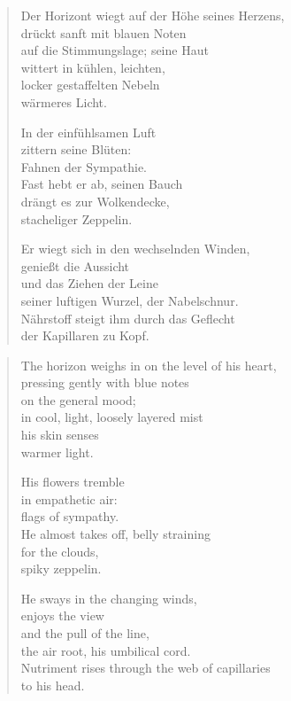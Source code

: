 
\cleartoverso


\begin{verse}
Der Horizont wiegt auf der Höhe seines Herzens,\\
drückt sanft mit blauen Noten\\
auf die Stimmungslage; seine Haut\\
wittert in kühlen, leichten,\\
locker gestaffelten Nebeln\\
wärmeres Licht.

In der einfühlsamen Luft\\
zittern seine Blüten:\\
Fahnen der Sympathie.\\
Fast hebt er ab, seinen Bauch\\
drängt es zur Wolkendecke,\\
stacheliger Zeppelin.

Er wiegt sich in den wechselnden Winden,\\
genießt die Aussicht\\
und das Ziehen der Leine\\
seiner luftigen Wurzel, der Nabelschnur.\\
Nährstoff steigt ihm durch das Geflecht\\
der Kapillaren zu Kopf.
\end{verse}

\clearpage


\begin{verse}
The horizon weighs in on the level of his heart,\\
pressing gently with blue notes\\
on the general mood;\\
in cool, light, loosely layered mist\\
his skin senses\\
warmer light.

His flowers tremble\\
in empathetic air:\\
flags of sympathy.\\
He almost takes off, belly straining\\
for the clouds,\\
spiky zeppelin.

He sways in the changing winds,\\
enjoys the view\\
and the pull of the line,\\
the air root, his umbilical cord.\\
Nutriment rises through the web of capillaries\\
to his head.
\end{verse}

